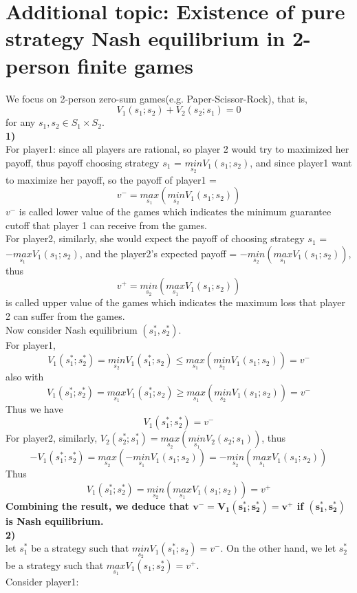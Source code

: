 \documentclass[twoside]{article}
\theoremstyle{definitionstyle}
\begin{document}
\section{Additional topic: Existence of pure strategy Nash equilibrium in 2-person finite games }
We focus on 2-person zero-sum games(e.g. Paper-Scissor-Rock), that is, 
\[
   V_1(s_1;s_2) + V_2(s_2;s_1) = 0
\]
for any $s_1, s_2 \in S_1\times S_2$.\\
\textbf{1)}\\
For player1: since all players are rational, so player 2 would try to maximized her payoff, thus payoff choosing strategy $s_1$ = $\underset{s_2}{min}V_1(s_1;s_2)$, and since player1 want to maximize her payoff, so the payoff of player1 = 
\[v^- = \underset{s_1}{max}(\underset{s_2}{min}V_1(s_1;s_2))\]
$v^-$ is called lower value of the games which indicates the minimum guarantee cutoff that player 1 can receive from the games. \\
For player2, similarly, she would expect  the payoff of choosing strategy $s_1$ = $-\underset{s_1}{max}V_1(s_1;s_2)$, and the player2's expected payoff = $-\underset{s_2}{min}(\underset{s_1}{max}V_1(s_1;s_2))$, thus 
\[v^+ = \underset{s_2}{min}(\underset{s_1}{max}V_1(s_1;s_2))\]
is called upper value of the games which indicates the maximum loss that player 2 can suffer from the games. \\
Now consider Nash equilibrium $(s_1^*, s_2^*)$. \\
For player1, 
\[ V_1(s_1^*;s_2^*)=\underset{s_2}{min}V_1(s_1^*;s_2)\leq\underset{s_1}{max}(\underset{s_2}{min}V_1(s_1;s_2))=v^-\]
also with
\[ V_1(s_1^*;s_2^*) = \underset{s_1}{max}V_1(s_1^*;s_2) \geq \underset{s_1}{max}(\underset{s_2}{min}V_1(s_1;s_2))=v^-\]
Thus we have 
\[V_1(s_1^*;s_2^*) = v^-\]
For player2, similarly, $V_2(s_2^*;s_1^*) = \underset{s_2}{max}(\underset{s_1}{min}V_2(s_2;s_1))$, thus 
$$-V_1(s_1^*;s_2^*)= \underset{s_2}{max}(-\underset{s_1}{min}V_1(s_1;s_2)) = -\underset{s_2}{min}(\underset{s_1}{max}V_1(s_1;s_2))$$
Thus $$V_1(s_1^*;s_2^*) = \underset{s_2}{min}(\underset{s_1}{max}V_1(s_1;s_2)) = v^+$$
\textbf{Combining the result, we deduce that $\mathbf{v^- = V_1(s_1^*;s_2^*) = v^+}$ if $(\mathbf{s_1^*,s_2^*})$ is Nash equilibrium.}\\
\textbf{2)}\\
let $s_1^*$ be a strategy such that $\underset{s_2}{min}V_1(s_1^*;s_2) = v^-$. On the other hand, we let $s_2^*$
be a strategy such that $\underset{s_1}{max}V_1(s_1;s_2^*) = v^+$.\\
Consider player1: 
\end{document}
